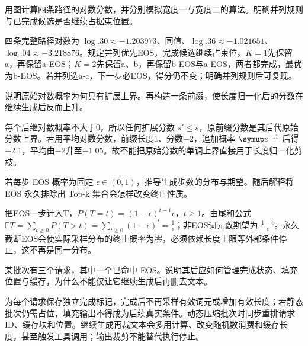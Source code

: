 \begin{exercises}
\begin{exercise}\optional 用图计算四条路径的对数分数，并分别模拟宽度一与宽度二的算法。明确并列规则与已完成候选是否继续占据束位置。

\begin{solution}
四条完整路径对数为 $\log.30\approx-1.203973$、同值、$\log.36\approx-1.021651$、$\log.04\approx-3.218876$。规定并列优先EOS，完成候选继续占束位。$K=1$先保留a，再保留a-EOS；$K=2$先保留a、b，再保留b-EOS与a-EOS，两者都完成，最优为b-EOS。若并列选a-c，下一步必EOS，得分仍不变；明确并列规则后可复现。
\end{solution}
\end{exercise}

\begin{exercise}\optional 说明原始对数概率为何具有扩展上界。再构造一条前缀，使长度归一化后的分数在继续生成后反而上升。

\begin{solution}
每个后继对数概率不大于0，所以任何扩展分数 $s'\le s$，原前缀分数是其后代原始分数上界。若用平均对数分数，前缀长度1、分数−2，追加概率 $\conste{}^{-.1}$ 后得−2.1，平均由−2升至−1.05。故不能把原始分数的单调上界直接用于长度归一化剪枝。
\end{solution}
\end{exercise}

\begin{exercise}\optional 若每步 EOS 概率为固定 $\epsilon\in(0,1)$，推导生成步数的分布与期望。随后解释将 EOS 永久排除出 Top-k 集合会怎样改变终止性质。

\begin{solution}
把EOS一步计入T，$P(T=t)=(1-\epsilon)^{t-1}\epsilon$，$t\ge1$。由尾和公式 $\mathbb ET=\sum_{t\ge0}P(T>t)=\sum_{t\ge0}(1-\epsilon)^t=\frac{1}{\epsilon}$；非EOS词元数期望为 $\frac{1-\epsilon}{\epsilon}$。永久截断EOS会使实际采样分布的终止概率为零，必须依赖长度上限等外部条件停止，这不再是同一分布。
\end{solution}
\end{exercise}

\begin{exercise} 某批次有三个请求，其中一个已命中 EOS。说明其后应如何管理完成状态、填充位置与缓存，为什么不能仅让它继续生成后再删去文本。

\begin{solution}
为每个请求保存独立完成标记，完成后不再采样有效词元或增加有效长度；若静态批次仍需占位，填充输出不得成为后续真实条件。动态压缩批次时同步重排请求ID、缓存块和位置。继续生成再裁文本会多用计算、改变随机数消费和缓存长度，甚至触发工具调用；输出裁剪不能替代执行停止。
\end{solution}
\end{exercise}


\end{exercises}
